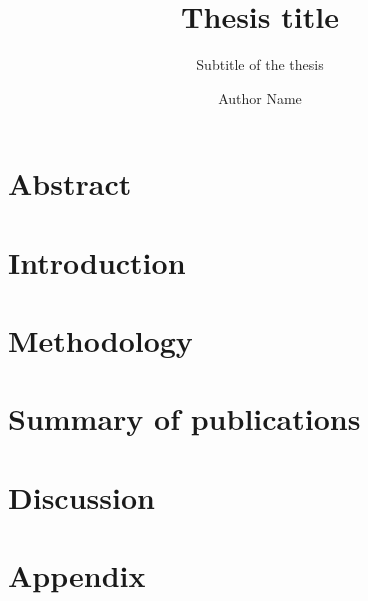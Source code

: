 \documentclass[
  a4paper,            %
  thesis=phd,         %
  english,            %
]{tum/tumbook}
\title{Thesis title}
\subtitle{Subtitle of the thesis}
\author{Author Name}
\begin{document}
\frontmatter
\maketitle
\chapter{Abstract}

\tableofcontents

\mainmatter
\chapter{Introduction}


\chapter{Methodology}


\chapter{Summary of publications}


\chapter{Discussion}


\appendix
\chapter{Appendix}
\lipsum[4]

% 
\end{document}
